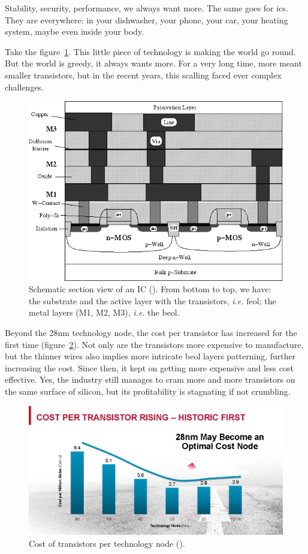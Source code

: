 \documentclass[11pt,a4paper]{report} %
\theoremstyle{customdef}
\begin{document}
Stability, security, performance, we always want more.
The same goes for \glspl{ic}.
They are everywhere: in your dishwasher, your phone, your car, your heating system, maybe even inside your body.

Take the figure~\ref{fig:trans}.
This little piece of technology is making the world go round.
But the world is greedy, it always wants more.
For a very long time, more meant smaller transistors, but in the recent years, this scalling faced ever complex challenges.

\begin{figure}[!h]
\centering
\includegraphics[width=.8\textwidth]{img/trans.png}
\caption{Schematic section view of an IC (\citet{Wittmann2007}).
From bottom to top, we have: the substrate and the active layer with the transistors, \textit{i.e.} \gls{feol}; the metal layers (M1, M2, M3), \textit{i.e.} the \gls{beol}.}
\label{fig:trans}
\end{figure}

Beyond the 28nm technology node, the cost per transistor has increased for the first time (figure~\ref{fig:cost-trans}).
Not only are the transistors more expensive to manufacture, but the thinner wires also implies more intricate \gls{beol} layers patterning, further increasing the cost.
Since then, it kept on getting more expensive and less cost effective.
Yes, the industry still manages to cram more and more transistors on the same surface of silicon, but its profitability is stagnating if not crumbling.

\begin{figure}[!h]
\centering
\includegraphics[width=.8\textwidth]{img/cost-trans.jpg}
\caption{Cost of transistors per technology node (\citep{electroiq2014}).}
\label{fig:cost-trans}
\end{figure}
\end{document}
